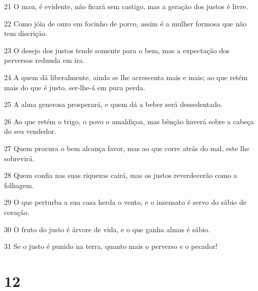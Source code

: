 \par 21 O mau, é evidente, não ficará sem castigo, mas a geração dos justos é livre.
\par 22 Como jóia de ouro em focinho de porco, assim é a mulher formosa que não tem discrição.
\par 23 O desejo dos justos tende somente para o bem, mas a expectação dos perversos redunda em ira.
\par 24 A quem dá liberalmente, ainda se lhe acrescenta mais e mais; ao que retém mais do que é justo, ser-lhe-á em pura perda.
\par 25 A alma generosa prosperará, e quem dá a beber será dessedentado.
\par 26 Ao que retém o trigo, o povo o amaldiçoa, mas bênção haverá sobre a cabeça do seu vendedor.
\par 27 Quem procura o bem alcança favor, mas ao que corre atrás do mal, este lhe sobrevirá.
\par 28 Quem confia nas suas riquezas cairá, mas os justos reverdecerão como a folhagem.
\par 29 O que perturba a sua casa herda o vento, e o insensato é servo do sábio de coração.
\par 30 O fruto do justo é árvore de vida, e o que ganha almas é sábio.
\par 31 Se o justo é punido na terra, quanto mais o perverso e o pecador!

\chapter{12}

